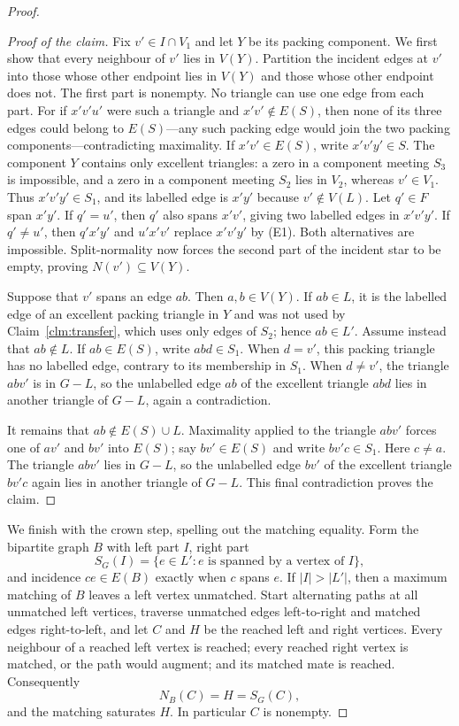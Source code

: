 \documentclass[11pt]{article}
\theoremstyle{definition}
\begin{document}
\begin{proof}
\begin{proof}[Proof of the claim]
Fix $v'\in I\cap V_1$ and let $Y$ be its packing component.  We first show
that every neighbour of $v'$ lies in $V(Y)$.  Partition the incident edges at
$v'$ into those whose other endpoint lies in $V(Y)$ and those whose other
endpoint does not.  The first part is nonempty.  No triangle can use one edge
from each part.  For if $x'v'u'$ were such a triangle and
$x'v'\notin E(S)$, then none of its three edges could belong to $E(S)$---any
such packing edge would join the two packing components---contradicting
maximality.  If $x'v'\in E(S)$, write $x'v'y'\in S$.  The component $Y$
contains only excellent triangles: a zero in a component meeting $S_3$ is
impossible, and a zero in a component meeting $S_2$ lies in $V_2$, whereas
$v'\in V_1$.  Thus $x'v'y'\in S_1$, and its labelled edge is $x'y'$ because
$v'\notin V(L)$.  Let $q'\in F$ span $x'y'$.  If $q'=u'$, then $q'$ also
spans $x'v'$, giving two labelled edges in $x'v'y'$.  If $q'\ne u'$, then
$q'x'y'$ and $u'x'v'$ replace $x'v'y'$ by (E1).  Both alternatives are
impossible.  Split-normality now forces the second part of the incident star
to be empty, proving $N(v')\subseteq V(Y)$.

Suppose that $v'$ spans an edge $ab$.  Then $a,b\in V(Y)$.  If $ab\in L$,
it is the labelled edge of an excellent packing triangle in $Y$ and was not
used by Claim~\ref{clm:transfer}, which uses only edges of $S_2$; hence
$ab\in L'$.  Assume instead that $ab\notin L$.  If $ab\in E(S)$, write
$abd\in S_1$.  When $d=v'$, this packing triangle has no labelled edge,
contrary to its membership in $S_1$.  When $d\ne v'$, the triangle $abv'$ is
in $G-L$, so the unlabelled edge $ab$ of the excellent triangle $abd$ lies in
another triangle of $G-L$, again a contradiction.

It remains that $ab\notin E(S)\cup L$.  Maximality applied to the triangle
$abv'$ forces one of $av'$ and $bv'$ into $E(S)$; say $bv'\in E(S)$ and
write $bv'c\in S_1$.  Here $c\ne a$.  The triangle $abv'$ lies in $G-L$, so
the unlabelled edge $bv'$ of the excellent triangle $bv'c$ again lies in
another triangle of $G-L$.  This final contradiction proves the claim.
\end{proof}

We finish with the crown step, spelling out the matching equality.  Form the
bipartite graph $B$ with left part $I$, right part
\[
  S_G(I)=\{e\in L': e\text{ is spanned by a vertex of }I\},
\]
and incidence $ce\in E(B)$ exactly when $c$ spans $e$.  If $|I|>|L'|$, then
a maximum matching of $B$ leaves a left vertex unmatched.  Start alternating
paths at all unmatched left vertices, traverse unmatched edges left-to-right
and matched edges right-to-left, and let $C$ and $H$ be the reached left and
right vertices.  Every neighbour of a reached left vertex is reached; every
reached right vertex is matched, or the path would augment; and its matched
mate is reached.  Consequently
\[
  N_B(C)=H=S_G(C),
\]
and the matching saturates $H$.  In particular $C$ is nonempty.


\end{proof}
\end{document}
